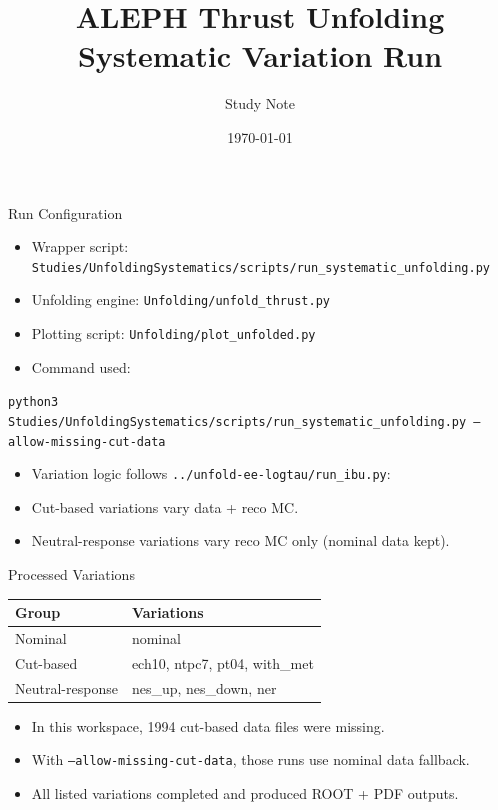\documentclass[aspectratio=169]{beamer}
\title{ALEPH Thrust Unfolding\\Systematic Variation Run}
\author{Study Note}
\date{\today}
\begin{document}
\begin{frame}
  \titlepage
\end{frame}

\begin{frame}{Run Configuration}
\begin{itemize}
  \item Wrapper script: \texttt{Studies/UnfoldingSystematics/scripts/run\_systematic\_unfolding.py}
  \item Unfolding engine: \texttt{Unfolding/unfold\_thrust.py}
  \item Plotting script: \texttt{Unfolding/plot\_unfolded.py}
  \item Command used:
\end{itemize}
\vspace{0.2em}
\texttt{python3 Studies/UnfoldingSystematics/scripts/run\_systematic\_unfolding.py --allow-missing-cut-data}
\vspace{0.4em}
\begin{itemize}
  \item Variation logic follows \texttt{../unfold-ee-logtau/run\_ibu.py}:
  \item Cut-based variations vary data + reco MC.
  \item Neutral-response variations vary reco MC only (nominal data kept).
\end{itemize}
\end{frame}

\begin{frame}{Processed Variations}
\begin{tabular}{ll}
\toprule
Group & Variations \\
\midrule
Nominal & nominal \\
Cut-based & ech10, ntpc7, pt04, with\_met \\
Neutral-response & nes\_up, nes\_down, ner \\
\bottomrule
\end{tabular}
\vspace{0.6em}
\begin{itemize}
  \item In this workspace, 1994 cut-based data files were missing.
  \item With \texttt{--allow-missing-cut-data}, those runs use nominal data fallback.
  \item All listed variations completed and produced ROOT + PDF outputs.
\end{itemize}
\end{frame}
\end{document}

